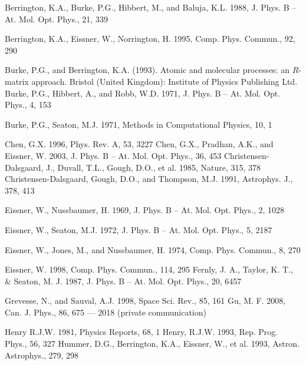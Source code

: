 \documentclass[11pt, double, phd]{osudiss-2}
\begin{document}
\begin {thebibliography} {}
 Berrington, K.A., Burke, P.G., Hibbert, M., and Baluja, K.L. 1988, J. Phys. B -- At. Mol. Opt. Phys.,  21, 339

 Berrington, K.A., Eissner, W., Norrington, H. 1995, Comp. Phys. Commun., 92, 290

 Burke, P.G., and Berrington, K.A. (1993). Atomic and molecular processes: an $R$-matrix approach. Bristol (United Kingdom): Institute of Physics Publishing Ltd.
 Burke, P.G., Hibbert, A., and Robb, W.D. 1971, J. Phys. B -- At. Mol. Opt. Phys., 4, 153

 Burke, P.G., Seaton, M.J. 1971, Methods in Computational Physics, 10, 1

 Chen, G.X. 1996, Phys. Rev. A, 53, 3227
 Chen, G.X., Pradhan, A.K., and Eissner, W. 2003,  J. Phys. B -- At. Mol. Opt. Phys., 36, 453
 Christensen-Dalsgaard, J., Duvall, T.L., Gough, D.O., et al. 1985, Nature, 315, 378
 Christensen-Dalsgaard, Gough, D.O., and Thompson, M.J. 1991, Astrophys. J., 378, 413

 Eissner, W., Nussbaumer, H. 1969, J. Phys. B -- At. Mol. Opt. Phys., 2, 1028

 Eissner, W., Seaton, M.J. 1972, J. Phys. B -- At. Mol. Opt. Phys., 5, 2187

 Eissner, W., Jones, M., and Nussbaumer, H. 1974, Comp. Phys. Commun., 8, 270

 Eissner, W. 1998, Comp. Phys. Commun., 114, 295
 Fernly, J. A., Taylor, K. T., \& Seaton, M. J. 1987, J. Phys. B -- At. Mol. Opt. Phys., 20, 6457

 Grevesse, N., and Sauval, A.J. 1998, Space Sci. Rev., 85, 161
 Gu, M. F. 2008, Can. J. Phys., 86, 675
 --- 2018 (private communication)

 Henry R.J.W. 1981, Physics Reports, 68, 1
 Henry, R.J.W. 1993, Rep. Prog. Phys., 56, 327
 Hummer, D.G., Berrington, K.A., Eissner, W., et al. 1993, Astron. Astrophys., 279, 298


\end{thebibliography}
\end{document}
